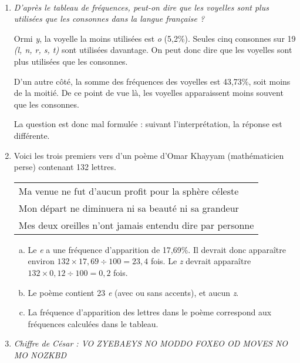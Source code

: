 \documentclass[11pt]{article}
\begin{document}
  \begin{exercice}[Statistiques]~
    \begin{enumerate}[(1)]
      \item

        \emph{D'après le tableau de fréquences, peut-on dire que les voyelles sont plus utilisées que les consonnes dans la langue française ?}

        Ormi \emph{y}, la voyelle la moins utilisées est \emph{o} (5,2\%).
        Seules cinq consonnes sur 19 \emph{(l, n, r, s, t)} sont utilisées
        davantage. On peut donc dire que les voyelles sont plus utilisées que
        les consonnes.

        D'un autre côté, la somme des fréquences des voyelles est 43,73\%, soit
        moins de la moitié. De ce point de vue là, les voyelles apparaissent
        moins souvent  que les consonnes.

        La question est donc mal formulée : suivant l'interprétation, la
        réponse est différente.


      \item Voici les trois premiers vers d'un poème d'Omar Khayyam
        (mathématicien perse) contenant 132 lettres.

        \begin{tabular}{|l}
          Ma venue ne fut d'aucun profit pour la sphère céleste\\
          Mon départ ne diminuera ni sa beauté ni sa grandeur\\
          Mes deux oreilles n'ont jamais entendu dire par personne\\
        \end{tabular}

        \begin{enumerate}[(a)]
          \item Le \emph{e} a une fréquence d'apparition de 17,69\%. Il devrait donc apparaître environ $132\times17,69\div100=23,4$ fois. Le \emph{z} devrait apparaître $132\times 0,12\div100=0,2$ fois.
          \item Le poème contient 23 \emph{e} (avec ou sans accents), et aucun \emph{z}.
          \item La fréquence d'apparition des lettres dans le poème correspond aux fréquences calculées dans le tableau.
        \end{enumerate}

      \item \emph{Chiffre de César : \og{}VO ZYEBAEYS NO MODDO FOXEO OD MOVES NO MO NOZKBD\fg}


\end{enumerate}
\end{exercice}
\end{document}
